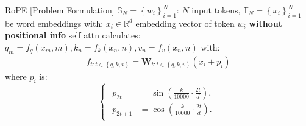 \documentclass{beamer}
\begin{document}
\begin{frame}[t]{RoPE [Problem Formulation]}
    $\mathbb{S}_N = \left\{w_i \right\}_{i=1}^N$: $N$ input tokens, 
    $\mathbb{E}_N = \left\{x_i \right\}_{i=1}^N$ be word embeddings \newline
    with: $x_i \in \mathbb{R}^d$ embedding vector of token $w_i$ \textbf{without positional info}
    \newline
    \newline
    self attn calculates: $q_m = f_q(x_m, m), k_n = f_k(x_n, n), v_n = f_v(x_n, n)$ with:
    \begin{gather}\label{eq:4}
        f_{t:t\in \left\{q,k,v\right\}} = \textbf{W}_{t:t\in \left\{q,k,v\right\}}(x_i + p_i)
    \end{gather}
    where $p_i$ is:
    \[
        \begin{cases}
        \begin{aligned}
        p_{2t} & = \sin\left(\frac{k}{10000} \cdot \frac{2t}{d}\right), \\
        p_{2t+1} & = \cos\left(\frac{k}{10000} \cdot \frac{2t}{d}\right).
        \end{aligned}
        \end{cases}
    \]
\end{frame}
\end{document}
